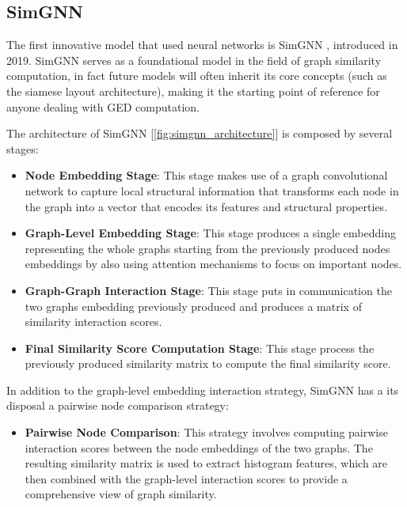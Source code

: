 \documentclass[../Thesis.tex]{subfiles}
\begin{document}
	\subsection{SimGNN}
	\label{sec:simgnn}
	
	The first innovative model that used neural networks is SimGNN \cite{simgnn__a_neural_network_approach_to_fast_graph_similarity_computation}, introduced in 2019. SimGNN serves as a foundational model in the field of graph similarity computation, in fact future models will often inherit its core concepts (such as the siamese layout architecture), making it the starting point of reference for anyone dealing with GED computation. 
	
	The architecture of SimGNN [\autoref{fig:simgnn_architecture}] is composed by several stages:
	
	\begin{itemize}
		\item \textbf{Node Embedding Stage}: This stage makes use of a graph convolutional network to capture local structural information that transforms each node in the graph into a vector that encodes its features and structural properties.
		\item \textbf{Graph-Level Embedding Stage}: This stage produces a single embedding representing the whole graphs starting from the previously produced nodes embeddings by also using attention mechanisms to focus on important nodes.
		\item \textbf{Graph-Graph Interaction Stage}: This stage puts in communication the two graphs embedding previously produced and produces a matrix of similarity interaction scores.
		\item \textbf{Final Similarity Score Computation Stage}: This stage process the previously produced similarity matrix to compute the final similarity score.
	\end{itemize}
	
	In addition to the graph-level embedding interaction strategy, SimGNN has a its disposal a pairwise node comparison strategy:
	
	\begin{itemize}
		\item \textbf{Pairwise Node Comparison}: This strategy involves computing pairwise interaction scores between the node embeddings of the two graphs. The resulting similarity matrix is used to extract histogram features, which are then combined with the graph-level interaction scores to provide a comprehensive view of graph similarity.
	\end{itemize}
	
\end{document}
